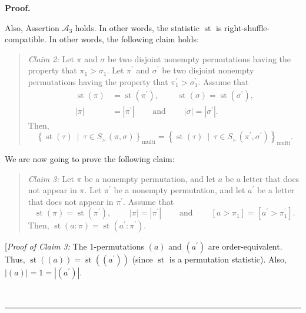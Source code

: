 \documentclass[numbers=enddot,12pt,final,onecolumn,notitlepage]{scrartcl}%
\theoremstyle{definition}
\newenvironment{statement}{\begin{quote}}{\end{quote}}
\newenvironment{proof}[1][Proof]{\noindent\textbf{#1.} }{\ \rule{0.5em}{0.5em}}
\newenvironment{verlong}{}{}
\begin{document}
\begin{verlong}
\begin{proof}
\begin{statement}
\end{statement}

Also, Assertion $\mathcal{A}_{3}$ holds. In other words, the statistic
$\operatorname*{st}$ is right-shuffle-compatible. In other words, the
following claim holds:

\begin{statement}
\textit{Claim 2:} Let $\pi$ and $\sigma$ be two disjoint nonempty permutations
having the property that $\pi_{1}>\sigma_{1}$. Let $\pi^{\prime}$ and
$\sigma^{\prime}$ be two disjoint nonempty permutations having the property
that $\pi_{1}^{\prime}>\sigma_{1}^{\prime}$. Assume that%
\begin{align*}
\operatorname*{st}\left(  \pi\right)   &  =\operatorname*{st}\left(
\pi^{\prime}\right)  ,\ \ \ \ \ \ \ \ \ \ \operatorname*{st}\left(
\sigma\right)  =\operatorname*{st}\left(  \sigma^{\prime}\right)  ,\\
\left\vert \pi\right\vert  &  =\left\vert \pi^{\prime}\right\vert
\ \ \ \ \ \ \ \ \ \ \text{and}\ \ \ \ \ \ \ \ \ \ \left\vert \sigma\right\vert
=\left\vert \sigma^{\prime}\right\vert .
\end{align*}
Then,
\[
\left\{  \operatorname*{st}\left(  \tau\right)  \ \mid\ \tau\in S_{\succ
}\left(  \pi,\sigma\right)  \right\}  _{\operatorname*{multi}}=\left\{
\operatorname*{st}\left(  \tau\right)  \ \mid\ \tau\in S_{\succ}\left(
\pi^{\prime},\sigma^{\prime}\right)  \right\}  _{\operatorname*{multi}}.
\]

\end{statement}

We are now going to prove the following claim:

\begin{statement}
\textit{Claim 3:} Let $\pi$ be a nonempty permutation, and let $a$ be a letter
that does not appear in $\pi$. Let $\pi^{\prime}$ be a nonempty permutation,
and let $a^{\prime}$ be a letter that does not appear in $\pi^{\prime}$.
Assume that%
\[
\operatorname*{st}\left(  \pi\right)  =\operatorname*{st}\left(  \pi^{\prime
}\right)  ,\ \ \ \ \ \ \ \ \ \ \left\vert \pi\right\vert =\left\vert
\pi^{\prime}\right\vert \ \ \ \ \ \ \ \ \ \ \text{and}%
\ \ \ \ \ \ \ \ \ \ \left[  a>\pi_{1}\right]  =\left[  a^{\prime}>\pi
_{1}^{\prime}\right]  .
\]
Then, $\operatorname*{st}\left(  a:\pi\right)  =\operatorname*{st}\left(
a^{\prime}:\pi^{\prime}\right)  $.
\end{statement}

[\textit{Proof of Claim 3:} The $1$-permutations $\left(  a\right)  $ and
$\left(  a^{\prime}\right)  $ are order-equivalent. Thus, $\operatorname*{st}%
\left(  \left(  a\right)  \right)  =\operatorname*{st}\left(  \left(
a^{\prime}\right)  \right)  $ (since $\operatorname*{st}$ is a permutation
statistic). Also, $\left\vert \left(  a\right)  \right\vert =1=\left\vert
\left(  a^{\prime}\right)  \right\vert $.


\end{proof}
\end{verlong}
\end{document}
